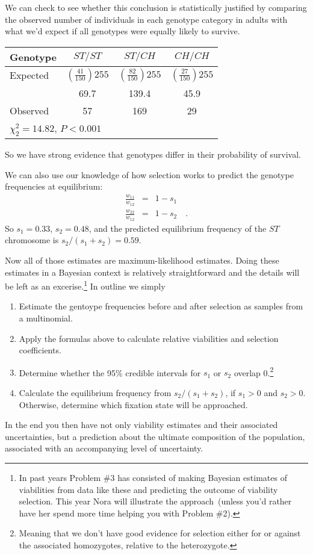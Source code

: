 \documentclass[12pt]{article}
\begin{document}
We can check to see whether this conclusion is statistically justified
by comparing the observed number of individuals in each genotype
category in adults with what we'd expect if all genotypes were equally
likely to survive.
\begin{center}
\begin{tabular}{l|ccc}
\hline\hline
Genotype & $ST/ST$ & $ST/CH$ & $CH/CH$ \\
\hline
Expected & $\left(\frac{41}{150}\right)255$ &
  $\left(\frac{82}{150}\right)255$ & $\left(\frac{27}{150}\right)255$ \\
         & 69.7    & 139.4   & 45.9 \\
Observed & 57      & 169     & 29 \\
\hline
\multicolumn{4}{l}{$\chi^2_2 = 14.82$, $P < 0.001$}
\end{tabular}
\end{center}
So we have strong evidence that genotypes differ in their probability
of survival.

We can also use our knowledge of how selection works to predict the
genotype frequencies at equilibrium:
\begin{eqnarray*}
\frac{w_{11}}{w_{12}} &=& 1 - s_1 \\
\frac{w_{22}}{w_{12}} &=& 1 - s_2 \quad .
\end{eqnarray*}
So $s_1 = 0.33$, $s_2 = 0.48$, and the predicted equilibrium frequency
of the $ST$ chromosome is $s_2/(s_1+s_2) = 0.59$.

Now all of those estimates are maximum-likelihood estimates. Doing
these estimates in a Bayesian context is relatively straightforward
and the details will be left as an excerise.\footnote{In past years
  Problem \#3 has consisted of making Bayesian estimates of
  viabilities from data like these and predicting the outcome of
  viability selection. This year Nora will illustrate the
  approach~(unless you'd rather have her spend more time helping you
  with Problem \#2).} In outline we simply

\begin{enumerate}

\item Estimate the gentoype frequencies before and after selection as
  samples from a multinomial.

\item Apply the formulas above to calculate relative viabilities and
  selection coefficients.

\item Determine whether the 95\% credible intervals for $s_1$ or $s_2$
  overlap 0.\footnote{Meaning that we don't have good evidence for
  selection either for or against the associated homozygotes, relative
  to the heterozygote.}

\item Calculate the equilibrium frequency from $s_2/(s_1+s_2)$, if
  $s_1 > 0$ and $s_2 > 0$. Otherwise, determine which fixation state will be
  approached.

\end{enumerate}

\noindent In the end you then have not only viability estimates and
their associated uncertainties, but a prediction about the ultimate
composition of the population, associated with an accompanying level
of uncertainty.




\ccLicense
\end{document}

